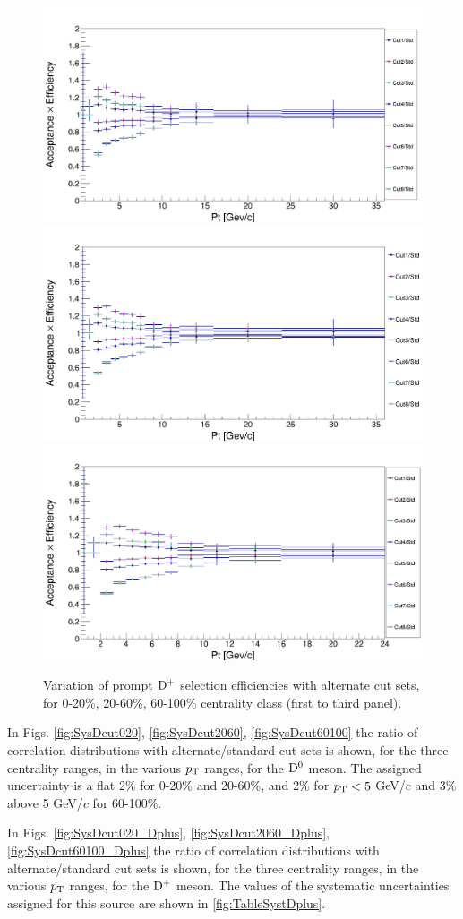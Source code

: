 \begin{figure}
\centering
{\includegraphics[width=0.48\linewidth]{Centrality_DPlus/Dplus/Eff_cmp/ratio_0_20.png}}
{\includegraphics[width=0.48\linewidth]{Centrality_DPlus/Dplus/Eff_cmp/ratio_cuts_20_60.png}}
{\includegraphics[width=0.48\linewidth]{Centrality_DPlus/Dplus/Eff_cmp/ratio_60_100.png}}
\caption{Variation of prompt ${\rm D^+}$ selection efficiencies with alternate cut sets, for 0-20\%, 20-60\%, 60-100\% centrality class (first to third panel).}
\label{fig:EffVariations_Dplus}
\end{figure}

In Figs. \ref{fig:SysDcut020}, \ref{fig:SysDcut2060}, \ref{fig:SysDcut60100} the ratio of correlation distributions with alternate/standard cut sets is shown, for the three centrality ranges, in the various $p_{\rm T}$ ranges, for the ${\rm D^0}$ meson.
The assigned uncertainty is a flat 2\% for 0-20\% and 20-60\%, and 2\% for $p_{\rm T} < 5$ GeV/$c$ and 3\% above 5 GeV/$c$ for 60-100\%.

In Figs. \ref{fig:SysDcut020_Dplus}, \ref{fig:SysDcut2060_Dplus}, \ref{fig:SysDcut60100_Dplus} the ratio of correlation distributions with alternate/standard cut sets is shown, for the three centrality ranges, in the various $p_{\rm T}$ ranges, for the ${\rm D^+}$ meson. The values of the systematic uncertainties assigned for this source are shown in \ref{fig:TableSystDplus}.


